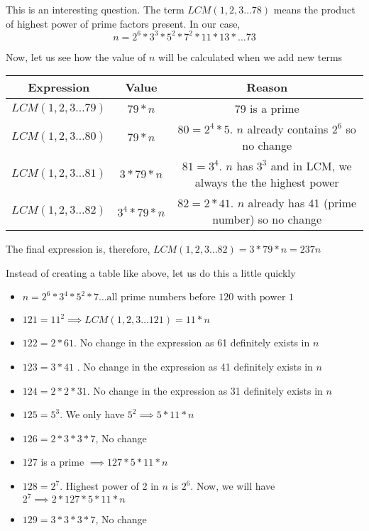 
This is an interesting question. The term $LCM(1,2,3 \ldots 78)$ means the product of highest power of prime factors present. In our case,
$$
n = 2^6 * 3^3 * 5^2 * 7^2 * 11 * 13 * \ldots 73
$$

Now, let us see how the value of $n$ will be calculated when we add new terms
\begin{table}[]
    \centering
    \begin{tabular}{|| c | c | c ||}
        \hline
         Expression & Value & Reason \\
        \hline
         $LCM(1,2,3 \ldots 79) $ & $79 * n$ & 79 is a prime \\
        \hline
         $LCM(1,2,3 \ldots 80) $ & $79 * n$ & $80 = 2^4 * 5$. $n$ already contains $2^6$ so no change \\
        \hline
         $LCM(1,2,3 \ldots 81) $ & $3 * 79 * n$ & $81 = 3^4$. $n$ has $3^3$ and in LCM, we always the the highest power \\
        \hline
         $LCM(1,2,3 \ldots 82) $ & $3^4 * 79 * n$ & $82 = 2 * 41$. $n$ already has 41 (prime number) so no change \\
        \hline
    \end{tabular}
\end{table}

The final expression is, therefore, $LCM(1,2,3 \ldots 82) = 3 * 79 * n = 237n$


Instead of creating a table like above, let us do this a little quickly
\begin{itemize}
    \item $n = 2^6 * 3^4 * 5^2 * 7 \ldots \text{all prime numbers before 120 with power 1}$
    \item $121 = 11^2 \implies LCM(1,2,3 \ldots 121) = 11 * n$
    \item $122 = 2 * 61$. No change in the expression as 61 definitely exists in $n$
    \item $123 = 3 * 41$ . No change in the expression as 41 definitely exists in $n$
    \item $124 = 2 * 2 * 31$. No change in the expression as 31 definitely exists in $n$
    \item $125 = 5^3$. We only have $5^2 \implies 5 * 11 * n$ 
    \item $126 = 2 * 3 * 3 * 7$, No change
    \item $127$ is a prime $\implies 127 * 5 * 11 * n$
    \item $128 = 2^7$. Highest power of 2 in $n$ is $2^6$. Now, we will have $2^7 \implies 2 * 127 * 5 * 11 * n$
    \item $129 = 3 * 3 * 3 * 7$, No change
\end{itemize}

